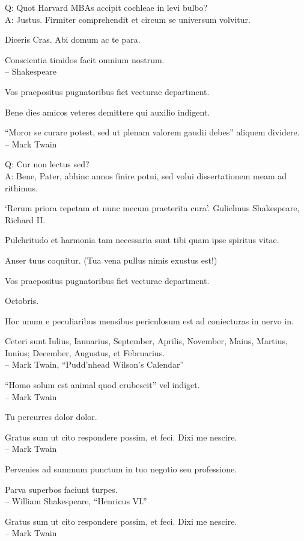 \documentclass[titlepage,12pt]{memoir}
\begin{document}
Q: Quot Harvard MBAs accipit cochleae in levi bulbo?\\
A: Justus. Firmiter comprehendit et circum se universum volvitur.

Diceris Cras. Abi domum ac te para.

Conscientia timidos facit omnium nostrum.
\\-- Shakespeare

Vos praepositus pugnatoribus fiet
vecturae department.

Bene dies amicos veteres demittere qui auxilio indigent.

“Moror se curare potest, sed ut plenam valorem gaudii debes”
aliquem dividere.
\\-- Mark Twain

Q: Cur non lectus sed?\\
A: Bene, Pater, abhinc annos finire potui, sed volui
dissertationem meam ad rithimus.

‘Rerum priora repetam et nunc mecum praeterita cura’.
Gulielmus Shakespeare, Richard II.

 Pulchritudo et harmonia tam necessaria sunt tibi quam ipse spiritus vitae.

Anser tuus coquitur.
(Tua vena pullus nimis exustus est!)

Vos praepositus pugnatoribus fiet
vecturae department.

Octobris.

Hoc unum e peculiaribus mensibus periculosum est ad coniecturas in nervo in.

Ceteri sunt Iulius, Ianuarius, September, Aprilis, November, Maius, Martius, Iunius;
December, Augustus, et Februarius.
\\-- Mark Twain, “Pudd’nhead Wilson’s Calendar”

“Homo solum est animal quod erubescit” vel indiget.
\\-- Mark Twain

Tu percurres dolor dolor.

 Gratus sum ut cito respondere possim, et feci. Dixi me nescire.
\\-- Mark Twain

Pervenies ad summum punctum in tuo negotio seu professione.

Parva superbos faciunt turpes.
\\-- William Shakespeare, “Henricus VI.”

 Gratus sum ut cito respondere possim, et feci. Dixi me nescire.
\\-- Mark Twain
\end{document}
